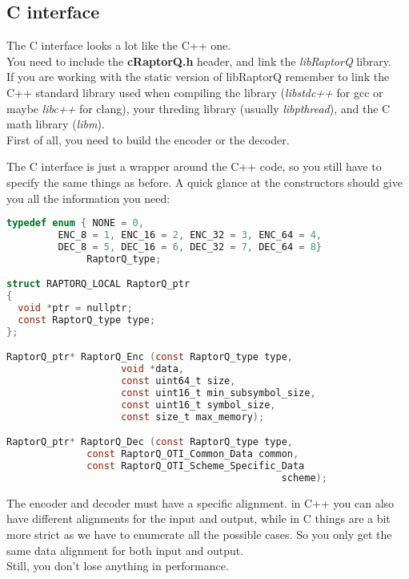 \documentclass[11pt,a4paper]{refart}
\begin{document}
\subsection{C interface}
The C interface looks a lot like the C++ one.\\
You need to include the \textbf{cRaptorQ.h} header, and link the \textit{libRaptorQ} library.\\
If you are working with the static version of libRaptorQ remember to link the C++ standard library used when
compiling the library (\textit{libstdc++} for gcc or maybe \textit{libc++} for clang), your threding library (usually \textit{libpthread}), and the C math library (\textit{libm}).\\

First of all, you need to build the encoder or the decoder.

The C interface is just a wrapper around the C++ code, so you still have to specify the same things as before.
A quick glance at the constructors should give you all the information you need:

\begin{lstlisting}[language=C]
typedef enum { NONE = 0,
         ENC_8 = 1, ENC_16 = 2, ENC_32 = 3, ENC_64 = 4,
         DEC_8 = 5, DEC_16 = 6, DEC_32 = 7, DEC_64 = 8}
              RaptorQ_type;

struct RAPTORQ_LOCAL RaptorQ_ptr
{
  void *ptr = nullptr;
  const RaptorQ_type type;
};

RaptorQ_ptr* RaptorQ_Enc (const RaptorQ_type type,
                    void *data,
                    const uint64_t size,
                    const uint16_t min_subsymbol_size,
                    const uint16_t symbol_size,
                    const size_t max_memory);

RaptorQ_ptr* RaptorQ_Dec (const RaptorQ_type type,
              const RaptorQ_OTI_Common_Data common,
              const RaptorQ_OTI_Scheme_Specific_Data
                                                scheme);
\end{lstlisting}

The encoder and decoder must have a specific alignment. in C++ you can also have different
alignments for the input and output, while in C things are a bit more strict as we have to enumerate
all the possible cases. So you only get the same data alignment for both input and output.\\
Still, you don't lose anything in performance.\\
\end{document}
